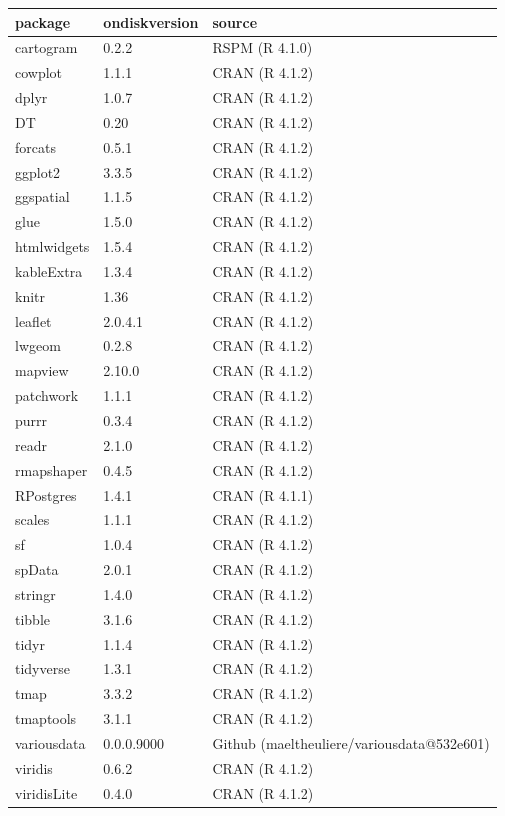 \documentclass[
]{book}
\begin{document}
\begin{table}
\centering
\begin{tabular}{l|l|l}
\hline
package & ondiskversion & source\\
\hline
cartogram & 0.2.2 & RSPM (R 4.1.0)\\
\hline
cowplot & 1.1.1 & CRAN (R 4.1.2)\\
\hline
dplyr & 1.0.7 & CRAN (R 4.1.2)\\
\hline
DT & 0.20 & CRAN (R 4.1.2)\\
\hline
forcats & 0.5.1 & CRAN (R 4.1.2)\\
\hline
ggplot2 & 3.3.5 & CRAN (R 4.1.2)\\
\hline
ggspatial & 1.1.5 & CRAN (R 4.1.2)\\
\hline
glue & 1.5.0 & CRAN (R 4.1.2)\\
\hline
htmlwidgets & 1.5.4 & CRAN (R 4.1.2)\\
\hline
kableExtra & 1.3.4 & CRAN (R 4.1.2)\\
\hline
knitr & 1.36 & CRAN (R 4.1.2)\\
\hline
leaflet & 2.0.4.1 & CRAN (R 4.1.2)\\
\hline
lwgeom & 0.2.8 & CRAN (R 4.1.2)\\
\hline
mapview & 2.10.0 & CRAN (R 4.1.2)\\
\hline
patchwork & 1.1.1 & CRAN (R 4.1.2)\\
\hline
purrr & 0.3.4 & CRAN (R 4.1.2)\\
\hline
readr & 2.1.0 & CRAN (R 4.1.2)\\
\hline
rmapshaper & 0.4.5 & CRAN (R 4.1.2)\\
\hline
RPostgres & 1.4.1 & CRAN (R 4.1.1)\\
\hline
scales & 1.1.1 & CRAN (R 4.1.2)\\
\hline
sf & 1.0.4 & CRAN (R 4.1.2)\\
\hline
spData & 2.0.1 & CRAN (R 4.1.2)\\
\hline
stringr & 1.4.0 & CRAN (R 4.1.2)\\
\hline
tibble & 3.1.6 & CRAN (R 4.1.2)\\
\hline
tidyr & 1.1.4 & CRAN (R 4.1.2)\\
\hline
tidyverse & 1.3.1 & CRAN (R 4.1.2)\\
\hline
tmap & 3.3.2 & CRAN (R 4.1.2)\\
\hline
tmaptools & 3.1.1 & CRAN (R 4.1.2)\\
\hline
variousdata & 0.0.0.9000 & Github (maeltheuliere/variousdata@532e601)\\
\hline
viridis & 0.6.2 & CRAN (R 4.1.2)\\
\hline
viridisLite & 0.4.0 & CRAN (R 4.1.2)\\
\hline
\end{tabular}
\end{table}
\end{document}
